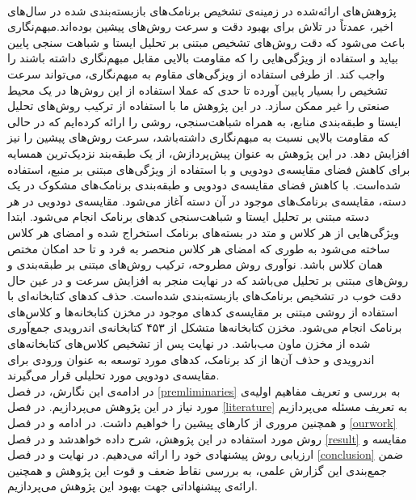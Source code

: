 \\
پژوهش‌های ارائه‌شده در زمینه‌ی تشخیص برنامک‌های بازبسته‌بندی شده در سال‌های اخیر، عمدتاً در تلاش برای بهبود دقت و سرعت روش‌های پیشین بوده‌اند.مبهم‌نگاری باعث می‌شود که دقت روش‌های تشخیص مبتنی بر تحلیل ایستا و شباهت سنجی پایین بیاید و استفاده از ویژگی‌هایی را که مقاومت بالایی مقابل مبهم‌نگاری داشته باشند را واجب کند. از طرفی استفاده از ویزگی‌های مقاوم به مبهم‌نگاری، می‌تواند سرعت تشخیص را بسیار پایین آورده تا حدی که عملا استفاده از این روش‌ها در یک محیط صنعتی را غیر ممکن سازد. در این پژوهش ما با استفاده از ترکیب روش‌های تحلیل ایستا و طبقه‌بندی منابع، به همراه شباهت‌سنجی، روشی را ارائه‌ کرده‌ایم که در حالی که مقاومت بالایی نسبت به مبهم‌نگاری داشته‌باشد، سرعت روش‌های پیشین را نیز افزایش دهد. در این پژوهش به عنوان پیش‌پردازش، از یک طبقه‌بند نزدیک‌ترین همسایه برای کاهش فضای مقایسه‌ی دودویی و با استفاده از ویژگی‌های مبتنی بر منبع، استفاده شده‌است. با کاهش فضای مقایسه‌ی دودویی و طبقه‌بندی برنامک‌های مشکوک در یک دسته، مقایسه‌ی برنامک‌های موجود در آن دسته آغاز می‌شود. مقایسه‌ی دودویی در هر دسته مبتنی بر تحلیل ایستا و شباهت‌سنجی کد‌های برنامک انجام می‌شود. ابتدا ویژگی‌هایی از هر کلاس و متد در بسته‌های برنامک استخراج شده و امضای هر کلاس ساخته می‌شود به طوری که امضای هر کلاس منحصر به فرد و تا حد امکان مختص همان کلاس باشد. نوآوری روش مطروحه، ترکیب روش‌های مبتنی بر طبقه‌بندی و روش‌های مبتنی بر تحلیل می‌باشد که در نهایت منجر به افزایش سرعت و در عین حال دقت خوب در تشخیص برنامک‌های بازبسته‌بندی شده‌است. حذف کد‌های کتابخانه‌ای با استفاده از روشی مبتنی بر مقایسه‌ی کد‌های موجود در مخزن کتابخانه‌ها و کلاس‌های برنامک انجام می‌شود. مخزن کتابخانه‌ها متشکل از ۴۵۳ کتابخانه‌ی اندرویدی جمع‌آوری شده‌ از مخزن ماون مب‌باشد.  در نهایت پس از تشخیص کلاس‌های کتابخانه‌های اندرویدی و حذف آن‌ها از کد برنامک، کد‌های مورد توسعه به عنوان ورودی برای مقایسه‌ی دودویی مورد تحلیلی قرار می‌گیرند.\\
در ادامه‌ی این نگارش،  در فصل
\ref{premliminaries}
به بررسی و تعریف مفاهیم اولیه‌ی مورد نیاز در این پژوهش می‌پردازیم. در فصل 
\ref{literature}
به تعریف مسئله می‌پردازیم و همچنین مروری از کار‌های پیشین را خواهیم داشت. 
در ادامه و در فصل 
\ref{ourwork}
 روش مورد استفاده در این پژوهش، شرح داده خواهد‌شد  و در فصل 
\ref{result}
مقایسه و ارزیابی روش پیشنهادی خود‌ را ارائه می‌دهیم. در نهایت و در فصل 
\ref{conclusion}
ضمن جمع‌بندی این گزارش علمی، به بررسی نقاط ضعف و قوت این پژوهش و همچنین ارائه‌ی پیشنهاداتی جهت بهبود این پژوهش می‌پردازیم.
 
 
 
 
 
 
 
 
 